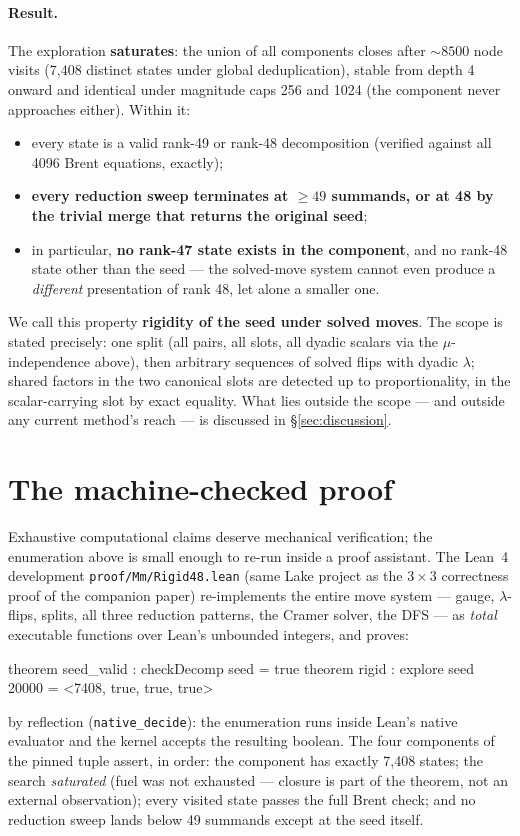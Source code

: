 \documentclass[10pt]{article}
\begin{document}
\paragraph{Result.}
The exploration \textbf{saturates}: the union of all components
closes after ${\sim}8500$ node visits (7{,}408 distinct states under
global deduplication), stable from depth 4 onward and identical under
magnitude caps 256 and 1024 (the component never approaches either).
Within it:
\begin{itemize}
\item every state is a valid rank-49 or rank-48 decomposition
  (verified against all 4096 Brent equations, exactly);
\item \textbf{every reduction sweep terminates at $\ge49$ summands,
  or at 48 by the trivial merge that returns the original seed};
\item in particular, \textbf{no rank-47 state exists in the
  component}, and no rank-48 state other than the seed --- the
  solved-move system cannot even produce a \emph{different}
  presentation of rank 48, let alone a smaller one.
\end{itemize}
We call this property \textbf{rigidity of the seed under solved
moves}. The scope is stated precisely: one split (all pairs, all
slots, all dyadic scalars via the $\mu$-independence above), then
arbitrary sequences of solved flips with dyadic $\lambda$; shared
factors in the two canonical slots are detected up to
proportionality, in the scalar-carrying slot by exact equality. What
lies outside the scope --- and outside any current method's reach ---
is discussed in \S\ref{sec:discussion}.

\section{The machine-checked proof}\label{sec:lean}

Exhaustive computational claims deserve mechanical verification; the
enumeration above is small enough to re-run inside a proof assistant.
The Lean~4 development
\texttt{proof/Mm/Rigid48.lean} (same Lake project
as the $3\times3$ correctness proof of the companion paper)
re-implements the entire move system --- gauge, $\lambda$-flips,
splits, all three reduction patterns, the Cramer solver, the DFS ---
as \emph{total} executable functions over Lean's unbounded integers,
and proves:
\begin{Code}
theorem seed_valid : checkDecomp seed = true
theorem rigid : explore seed 20000 = <7408, true, true, true>
\end{Code}
by reflection (\texttt{native\_decide}): the enumeration runs inside
Lean's native evaluator and the kernel accepts the resulting boolean.
The four components of the pinned tuple assert, in order: the
component has exactly 7{,}408 states; the search \emph{saturated}
(fuel was not exhausted --- closure is part of the theorem, not an
external observation); every visited state passes the full Brent
check; and no reduction sweep lands below 49 summands except at the
seed itself.
\end{document}
